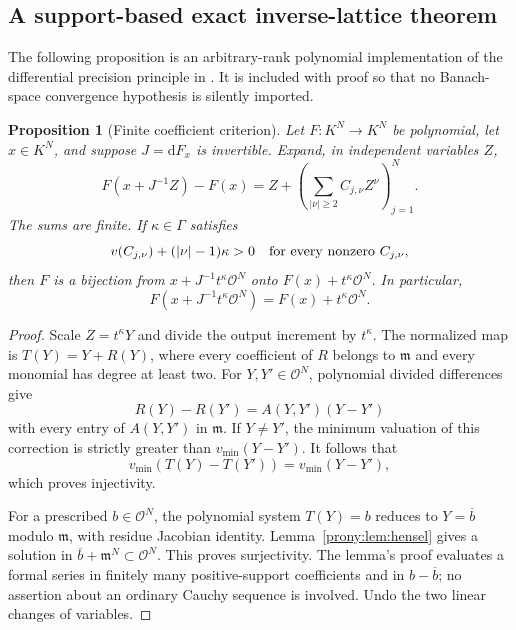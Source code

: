 \documentclass[11pt,letterpaper]{article}
\newtheorem{proposition}[theorem]{Proposition}
\theoremstyle{definition}
\theoremstyle{remark}
\newcommand{\Ocal}{\mathcal O}
\newcommand{\mfr}{\mathfrak m}
\newcommand{\dd}{\mathrm d}
\begin{document}
\subsection{A support-based exact inverse-lattice theorem}
The following proposition is an arbitrary-rank polynomial implementation
of the differential precision principle in \cite{CRV}. It is included with
proof so that no Banach-space convergence hypothesis is silently imported.

\begin{proposition}[Finite coefficient criterion]\label{prony:prop:lattice}
Let $F:K^N\to K^N$ be polynomial, let $x\in K^N$, and suppose
$J=\dd F_x$ is invertible. Expand, in independent variables $Z$,
\begin{equation}\label{prony:eq:Cexpand}
 F(x+J^{-1}Z)-F(x)
 =Z+\left(\sum_{|\nu|\ge2} C_{j,\nu} Z^\nu\right)_{j=1}^N.
\end{equation}
The sums are finite. If $\kappa\in\Gamma$ satisfies
\begin{equation}\label{prony:eq:latticecriterion}
 v(C_{j,\nu})+(|\nu|-1)\kappa>0
 \quad\hbox{for every nonzero }C_{j,\nu},
\end{equation}
then $F$ is a bijection from $x+J^{-1}t^\kappa\Ocal^N$ onto
$F(x)+t^\kappa\Ocal^N$. In particular,
\begin{equation}\label{prony:eq:latticeimage}
 F(x+J^{-1}t^\kappa\Ocal^N)=F(x)+t^\kappa\Ocal^N.
\end{equation}
\end{proposition}
\begin{proof}
Scale $Z=t^\kappa Y$ and divide the output increment by $t^\kappa$.
The normalized map is
$T(Y)=Y+R(Y)$, where every coefficient of $R$ belongs to $\mfr$ and every
monomial has degree at least two.
For $Y,Y'\in\Ocal^N$, polynomial divided differences give
\[
 R(Y)-R(Y')=A(Y,Y')(Y-Y')
\]
with every entry of $A(Y,Y')$ in $\mfr$. If $Y\ne Y'$, the minimum
valuation of this correction is strictly greater than
$v_{\min}(Y-Y')$. It follows that
\[
 v_{\min}(T(Y)-T(Y'))=v_{\min}(Y-Y'),
\]
which proves injectivity.

For a prescribed $b\in\Ocal^N$, the polynomial system $T(Y)=b$ reduces
to $Y=\overline b$ modulo $\mfr$, with residue Jacobian identity.
Lemma~\ref{prony:lem:hensel} gives a solution in
$\overline b+\mfr^N\subset\Ocal^N$. This proves surjectivity.
The lemma's proof evaluates a formal series in finitely many positive-support
coefficients and in $b-\overline b$; no assertion about an ordinary Cauchy
sequence is involved. Undo the two linear changes of variables.
\end{proof}
\end{document}
